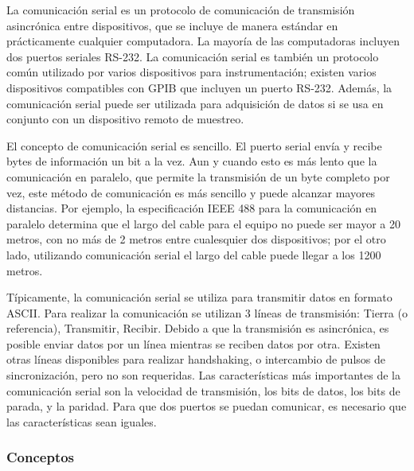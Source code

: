 La comunicación serial es un protocolo de comunicación de transmisión asincrónica entre dispositivos, que se incluye de manera estándar en prácticamente cualquier computadora. La mayoría de las computadoras incluyen dos puertos seriales RS-232. La comunicación serial es también un protocolo común utilizado por varios dispositivos para instrumentación; existen varios dispositivos compatibles con GPIB que incluyen un puerto RS-232. Además, la comunicación serial puede ser utilizada para adquisición de datos si se usa en conjunto con un dispositivo remoto de muestreo.

El concepto de comunicación serial es sencillo. El puerto serial envía y recibe bytes de información un bit a la vez. Aun y cuando esto es más lento que la comunicación en paralelo, que permite la transmisión de un byte completo por vez, este método de comunicación es más sencillo y puede alcanzar mayores distancias. Por ejemplo, la especificación IEEE 488 para la comunicación en paralelo determina que el largo del cable para el equipo no puede ser mayor a 20 metros, con no más de 2 metros entre cualesquier dos dispositivos; por el otro lado, utilizando comunicación serial el largo del cable puede llegar a los 1200 metros.

Típicamente, la comunicación serial se utiliza para transmitir datos en formato ASCII. Para realizar la comunicación se utilizan 3 líneas de transmisión: Tierra (o referencia), Transmitir, Recibir. Debido a que la transmisión es asincrónica, es posible enviar datos por un línea mientras se reciben datos por otra. Existen otras líneas disponibles para realizar handshaking, o intercambio de pulsos de sincronización, pero no son requeridas. Las características más importantes de la comunicación serial son la velocidad de transmisión, los bits de datos, los bits de parada, y la paridad. Para que dos puertos se puedan comunicar, es necesario que las características sean iguales.\cite{intro_serial}

\subsubsection{Conceptos} %
\label{ssub:conceptos}


